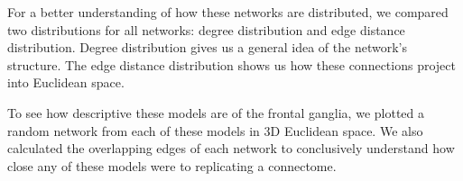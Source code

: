 For a better understanding of how these networks are distributed, we compared two distributions for all networks: degree distribution and edge distance distribution. 
Degree distribution gives us a general idea of the network's structure. The edge distance distribution shows us how these connections project into Euclidean space.

To see how descriptive these models are of the \ce frontal ganglia, we plotted a random network from each of these models in 3D Euclidean space.
We also calculated the overlapping edges of each network to conclusively understand how close any of these models were to replicating a \ce connectome.